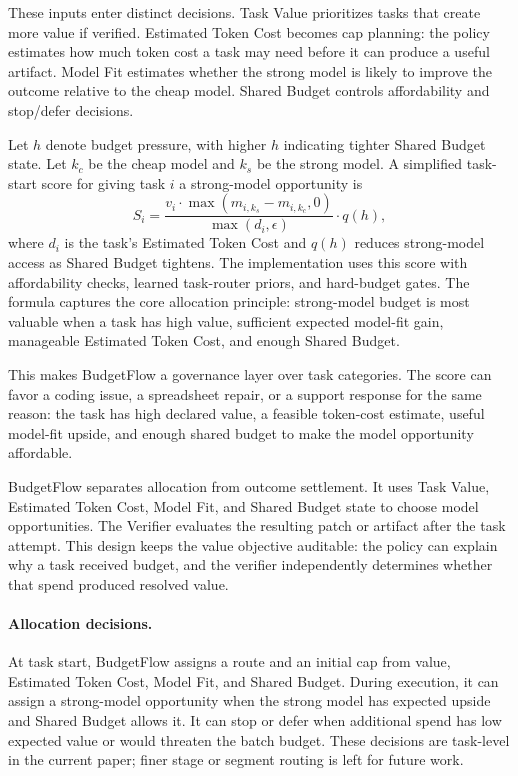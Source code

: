 \documentclass[sigconf,review,anonymous]{acmart}
\newcommand{\method}{BudgetFlow\xspace}
\newcommand{\taskvalue}{Task Value\xspace}
\newcommand{\tokencost}{Estimated Token Cost\xspace}
\newcommand{\modelfit}{Model Fit\xspace}
\newcommand{\sharedbudget}{Shared Budget\xspace}
\newcommand{\verifier}{Verifier\xspace}
\begin{document}
These inputs enter distinct decisions. \taskvalue prioritizes tasks that create more value if verified. \tokencost becomes cap planning: the policy estimates how much token cost a task may need before it can produce a useful artifact. \modelfit estimates whether the strong model is likely to improve the outcome relative to the cheap model. \sharedbudget controls affordability and stop/defer decisions.

Let $h$ denote budget pressure, with higher $h$ indicating tighter \sharedbudget state. Let $k_c$ be the cheap model and $k_s$ be the strong model. A simplified task-start score for giving task $i$ a strong-model opportunity is
\[
    S_i =
    \frac{v_i \cdot \max(m_{i,k_s}-m_{i,k_c},0)}
    {\max(d_i,\epsilon)}
    \cdot q(h),
\]
where $d_i$ is the task's \tokencost and $q(h)$ reduces strong-model access as \sharedbudget tightens. The implementation uses this score with affordability checks, learned task-router priors, and hard-budget gates. The formula captures the core allocation principle: strong-model budget is most valuable when a task has high value, sufficient expected model-fit gain, manageable \tokencost, and enough \sharedbudget.

This makes \method a governance layer over task categories. The score can favor a coding issue, a spreadsheet repair, or a support response for the same reason: the task has high declared value, a feasible token-cost estimate, useful model-fit upside, and enough shared budget to make the model opportunity affordable.

\method separates allocation from outcome settlement. It uses \taskvalue, \tokencost, \modelfit, and \sharedbudget state to choose model opportunities. The \verifier evaluates the resulting patch or artifact after the task attempt. This design keeps the value objective auditable: the policy can explain why a task received budget, and the verifier independently determines whether that spend produced resolved value.

\paragraph{Allocation decisions.}
At task start, \method assigns a route and an initial cap from value, \tokencost, \modelfit, and \sharedbudget. During execution, it can assign a strong-model opportunity when the strong model has expected upside and \sharedbudget allows it. It can stop or defer when additional spend has low expected value or would threaten the batch budget. These decisions are task-level in the current paper; finer stage or segment routing is left for future work.
\end{document}
